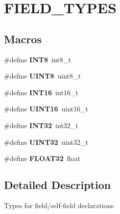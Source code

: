 \hypertarget{group___f_i_e_l_d___t_y_p_e_s}{}\section{F\+I\+E\+L\+D\+\_\+\+T\+Y\+P\+ES}
\label{group___f_i_e_l_d___t_y_p_e_s}
\subsection*{Macros}
\begin{DoxyCompactItemize}
\item 
\mbox{\label{group___f_i_e_l_d___t_y_p_e_s_ga7e125472d65b57f10905accbed140b99}} 
\#define {\bfseries I\+N\+T8}~int8\+\_\+t
\item 
\mbox{\label{group___f_i_e_l_d___t_y_p_e_s_gad8ce12d83f204245685f98caf9d03944}} 
\#define {\bfseries U\+I\+N\+T8}~uint8\+\_\+t
\item 
\mbox{\label{group___f_i_e_l_d___t_y_p_e_s_gabc743ce126c3ada10501baffb3ca2295}} 
\#define {\bfseries I\+N\+T16}~int16\+\_\+t
\item 
\mbox{\label{group___f_i_e_l_d___t_y_p_e_s_gab1922c2d8643eb7da964d427604e992e}} 
\#define {\bfseries U\+I\+N\+T16}~uint16\+\_\+t
\item 
\mbox{\label{group___f_i_e_l_d___t_y_p_e_s_gaac92c5ec332dafe0abb24688dad1b795}} 
\#define {\bfseries I\+N\+T32}~int32\+\_\+t
\item 
\mbox{\label{group___f_i_e_l_d___t_y_p_e_s_ga69afa2e50b905f4eab1f2df8a3fd9f23}} 
\#define {\bfseries U\+I\+N\+T32}~uint32\+\_\+t
\item 
\mbox{\label{group___f_i_e_l_d___t_y_p_e_s_ga9986d66f29078f384212483386d8df81}} 
\#define {\bfseries F\+L\+O\+A\+T32}~float
\end{DoxyCompactItemize}


\subsection{Detailed Description}
Types for field/self-\/field declarations 